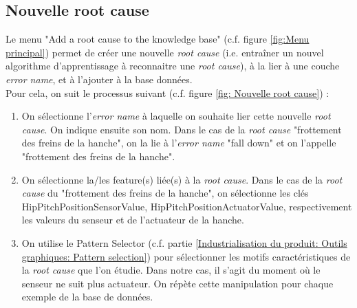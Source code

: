\subsection{Nouvelle root cause}
\label{Industrialisation du produit: Utilisation suggérée des outils: Nouvelle root cause}
Le menu "Add a root cause to the knowledge base" (c.f. figure \ref{fig:Menu principal}) permet de créer une nouvelle \emph{root cause} (i.e. entraîner un nouvel algorithme d'apprentissage à reconnaitre une \emph{root cause}), à la lier à une couche \emph{error name}, et à l'ajouter à la base données. \\
Pour cela, on suit le processus suivant (c.f. figure \ref{fig: Nouvelle root cause}) : 
\begin{enumerate}
	\item On sélectionne l'\emph{error name} à laquelle on souhaite lier cette nouvelle \emph{root cause}. On indique ensuite son nom. Dans le cas de la \emph{root cause} "frottement des freins de la hanche", on la lie à l'\emph{error name} "fall down" et on l'appelle "frottement des freins de la hanche". 
	\item On sélectionne la/les feature(s) liée(s) à la \emph{root cause}. Dans le cas de la \emph{root cause} du "frottement des freins de la hanche", on sélectionne les clés HipPitchPositionSensorValue, HipPitchPositionActuatorValue, respectivement les valeurs du senseur et de l'actuateur de la hanche. 
	\item On utilise le Pattern Selector (c.f. partie \ref{Industrialisation du produit: Outils graphiques: Pattern selection}) pour sélectionner les motifs caractéristiques de la \emph{root cause} que l'on étudie. Dans notre cas, il s'agit du moment où le senseur ne suit plus actuateur. On répète cette manipulation pour chaque exemple de la base de données.
\end{enumerate}

